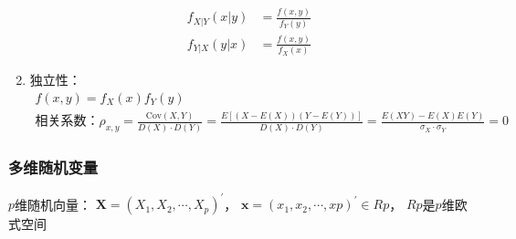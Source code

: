 \documentclass[12pt]{book}
\begin{document}
\begin{enumerate}[1.]
\begin{align*}
        f_{X|Y}(x|y) &= \frac{f(x,y)}{f_{Y}(y)} \\
        f_{Y|X}(y|x) &= \frac{f(x,y)}{f_{X}(x)}
    \end{align*}
    \item 独立性：
    \begin{gather*}
        f(x,y) = f_{X}(x) f_{Y}(y) \\
        \text{相关系数：}\rho_{x,y} = \frac{\mathrm{Cov}(X,Y)}{D(X)\cdot D(Y)}
        = \frac{E[(X-E(X))(Y-E(Y))]}{D(X)\cdot D(Y)} 
        =\frac{E(XY)-E(X)E(Y)}{\sigma_X\cdot \sigma_Y} = 0
    \end{gather*}
\end{enumerate}


\subsubsection{多维随机变量}


$p$维随机向量：
$\mathbf{X}=(X_1,X_2,\cdots,X_p)^\prime$，
$ \mathbf{x} = (x_1,x_2,\cdots,xp)^\prime \in Rp$，
$Rp$是$p$维欧式空间
\end{document}
